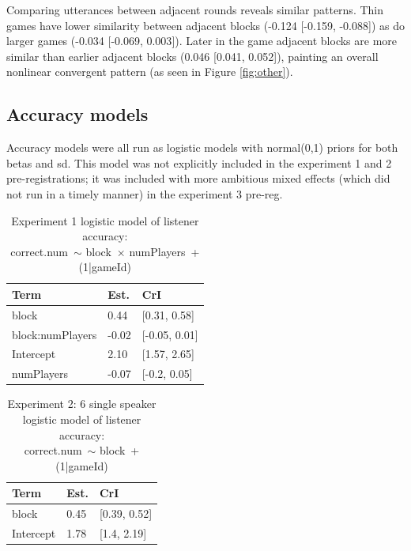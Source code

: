 \documentclass[
  english,
  a4paper,
]{article}
\begin{document}
Comparing utterances between adjacent rounds reveals similar patterns. Thin games have lower similarity between adjacent blocks (-0.124 {[}-0.159, -0.088{]}) as do larger games (-0.034 {[}-0.069, 0.003{]}). Later in the game adjacent blocks are more similar than earlier adjacent blocks (0.046 {[}0.041, 0.052{]}), painting an overall nonlinear convergent pattern (as seen in Figure \ref{fig:other}).

\hypertarget{accuracy-models}{%
\subsection{Accuracy models}\label{accuracy-models}}

Accuracy models were all run as logistic models with normal(0,1) priors for both betas and sd. This model was not explicitly included in the experiment 1 and 2 pre-registrations; it was included with more ambitious mixed effects (which did not run in a timely manner) in the experiment 3 pre-reg.

\begin{table}[h!]

\caption{\label{tab:unnamed-chunk-11}Experiment 1 logistic model of listener accuracy:\\ correct.num~$\sim$ block~$\times$ numPlayers~+ (1|gameId)}
\centering
\begin{tabular}[t]{lll}
\toprule
Term & Est. & CrI\\
\midrule
block & 0.44 & {}[0.31, 0.58]\\
block:numPlayers & -0.02 & {}[-0.05, 0.01]\\
Intercept & 2.10 & {}[1.57, 2.65]\\
numPlayers & -0.07 & {}[-0.2, 0.05]\\
\bottomrule
\end{tabular}
\end{table}

\begin{table}[h!]

\caption{\label{tab:unnamed-chunk-11}Experiment 2: 6 single speaker logistic model of listener accuracy:\\ correct.num~$\sim$ block~+ (1|gameId)}
\centering
\begin{tabular}[t]{lll}
\toprule
Term & Est. & CrI\\
\midrule
block & 0.45 & {}[0.39, 0.52]\\
Intercept & 1.78 & {}[1.4, 2.19]\\
\bottomrule
\end{tabular}
\end{table}
\end{document}
